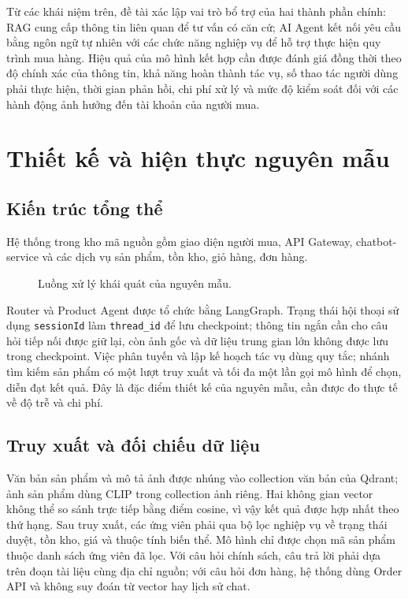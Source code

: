 \documentclass[12pt,a4paper,oneside]{report}
\begin{document}
Từ các khái niệm trên, đề tài xác lập vai trò bổ trợ của hai thành phần chính: RAG cung cấp thông tin liên quan để tư vấn có căn cứ; AI Agent kết nối yêu cầu bằng ngôn ngữ tự nhiên với các chức năng nghiệp vụ để hỗ trợ thực hiện quy trình mua hàng. Hiệu quả của mô hình kết hợp cần được đánh giá đồng thời theo độ chính xác của thông tin, khả năng hoàn thành tác vụ, số thao tác người dùng phải thực hiện, thời gian phản hồi, chi phí xử lý và mức độ kiểm soát đối với các hành động ảnh hưởng đến tài khoản của người mua.

\chapter{Thiết kế và hiện thực nguyên mẫu}
\section{Kiến trúc tổng thể}
Hệ thống trong kho mã nguồn gồm giao diện người mua, API Gateway, chatbot-service và các dịch vụ sản phẩm, tồn kho, giỏ hàng, đơn hàng. 
\begin{figure}[H]\centering
{}
\caption{Luồng xử lý khái quát của nguyên mẫu.}\label{fig:architecture}
\end{figure}

Router và Product Agent được tổ chức bằng LangGraph. Trạng thái hội thoại sử dụng \texttt{sessionId} làm \texttt{thread\_id} để lưu checkpoint; thông tin ngắn cần cho câu hỏi tiếp nối được giữ lại, còn ảnh gốc và dữ liệu trung gian lớn không được lưu trong checkpoint. Việc phân tuyến và lập kế hoạch tác vụ dùng quy tắc; nhánh tìm kiếm sản phẩm có một lượt truy xuất và tối đa một lần gọi mô hình để chọn, diễn đạt kết quả. Đây là đặc điểm thiết kế của nguyên mẫu, cần được đo thực tế về độ trễ và chi phí.

\section{Truy xuất và đối chiếu dữ liệu}
Văn bản sản phẩm và mô tả ảnh được nhúng vào collection văn bản của Qdrant; ảnh sản phẩm dùng CLIP trong collection ảnh riêng. Hai không gian vector không thể so sánh trực tiếp bằng điểm cosine, vì vậy kết quả được hợp nhất theo thứ hạng. Sau truy xuất, các ứng viên phải qua bộ lọc nghiệp vụ về trạng thái duyệt, tồn kho, giá và thuộc tính biến thể. Mô hình chỉ được chọn mã sản phẩm thuộc danh sách ứng viên đã lọc. Với câu hỏi chính sách, câu trả lời phải dựa trên đoạn tài liệu cùng địa chỉ nguồn; với câu hỏi đơn hàng, hệ thống dùng Order API và không suy đoán từ vector hay lịch sử chat.
\end{document}
